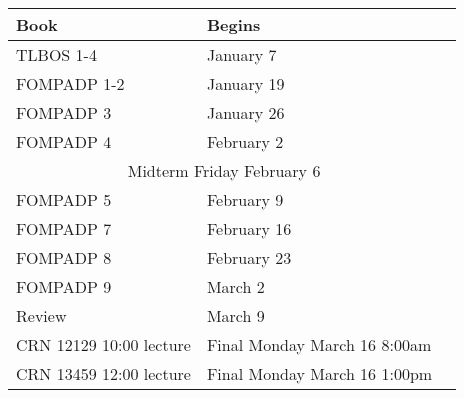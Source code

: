 \documentclass{article}
\begin{document}
\begin{itemize}
\begin{tabular}{|l|l|l|}\hline
Book & Begins\\\hline
TLBOS  1-4 & January 7 \\
FOMPADP 1-2 & January 19 \\
FOMPADP 3 & January 26\\
FOMPADP 4 & February 2\\\hline
\multicolumn{2}{|c|}{Midterm Friday February 6} \\\hline
FOMPADP 5 & February 9\\
FOMPADP 7 & February 16\\
FOMPADP 8 & February 23\\
FOMPADP 9 & March 2\\
Review &  March 9 \\\hline
{CRN 12129 10:00 lecture}&{Final Monday March 16 8:00am}\\\hline
{CRN 13459 12:00 lecture}&{Final Monday March 16 1:00pm}\\\hline
\end{tabular}
\end{itemize}
\end{document}
